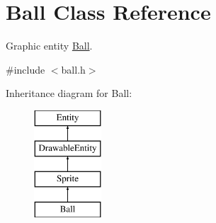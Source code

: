 \hypertarget{class_ball}{}\section{Ball Class Reference}
\label{class_ball}


Graphic entity \hyperlink{class_ball}{Ball}.  




{\ttfamily \#include $<$ball.\+h$>$}

Inheritance diagram for Ball\+:\begin{figure}[H]
\begin{center}
\leavevmode
\includegraphics[height=4.000000cm]{class_ball}
\end{center}
\end{figure}
